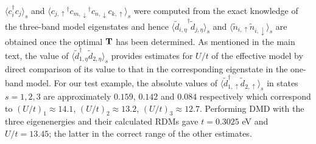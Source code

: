 $\langle c_i^{\dagger} c_j \rangle_s$ and $\langle {c_{j,\uparrow}}^{\dagger} {c_{m,\downarrow}}^{\dagger} c_{n,\downarrow} c_{k,\uparrow} \rangle_{s}$ were computed from the exact knowledge of the three-band model eigenstates and hence $\langle {\tilde{d}_{i,\eta}}^{\dagger} \tilde{d}_{j,\eta} \rangle_{s}$ 
and $\langle \tilde{n}_{i,\uparrow} \tilde{n}_{i,\downarrow} \rangle_{s}$ are obtained 
once the optimal ${\bf T}$ has been determined. 
As mentioned in the main text, the value of $\langle \tilde{d}_{1,\eta}^{\dagger} \tilde{d}_{2,\eta} \rangle_s$ provides estimates for $U/t$ of the effective model by direct comparison of its value to that in the 
corresponding eigenstate in the one-band model. For our test example, the absolute values of $\langle \tilde{d}_{1,\uparrow}^{\dagger} \tilde{d}_{2,\uparrow} \rangle_s$ 
in states $s=1,2,3$ are approximately $0.159$, $0.142$ and $0.084$ respectively which correspond to $(U/t)_1 \approx 14.1 $, $(U/t)_2 \approx 13.2 $, $(U/t)_3 \approx 12.7 $. 
Performing DMD with the three eigenenergies and their calculated RDMs gave $t=0.3025$ eV and $U/t = 13.45 $; the latter in the correct range of the other estimates.  
 
